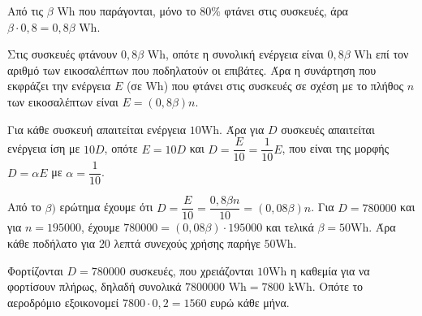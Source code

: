
\begin{alist}
\item Από τις $\beta\text{ Wh}$ που παράγονται, μόνο το $80\%$ φτάνει στις συσκευές, άρα $\beta \cdot 0,8 = 0,8\beta\text{ Wh}$.

\item
\begin{rlist}
\item Στις συσκευές φτάνουν $0,8\beta\text{ Wh}$, οπότε η συνολική ενέργεια είναι $0,8\beta\text{ Wh}$ επί τον αριθμό των εικοσαλέπτων που ποδηλατούν οι επιβάτες. Άρα η συνάρτηση που εκφράζει την ενέργεια $E$ (σε $\text{Wh}$) που φτάνει στις συσκευές σε σχέση με το πλήθος $n$ των εικοσαλέπτων είναι $E = (0,8\beta)n$.
\item Για κάθε συσκευή απαιτείται ενέργεια $10\text{Wh}$. Άρα για $D$ συσκευές απαιτείται ενέργεια ίση με $10D$, οπότε $E = 10D$ και $D = \dfrac{E}{10} = \dfrac{1}{10}E$, που είναι της μορφής $D = \alpha E$ με $\alpha = \dfrac{1}{10}$.
\end{rlist}

\item
\begin{rlist}
\item Από το $\beta)$ ερώτημα έχουμε ότι $D = \dfrac{E}{10} = \dfrac{0,8\beta n}{10} = (0,08\beta)n$.
Για $D = 780000$ και για $n = 195000$, έχουμε $780000 = (0,08\beta) \cdot 195000$ και τελικά $\beta = 50\text{Wh}$. Άρα κάθε ποδήλατο για $20$ λεπτά συνεχούς χρήσης παρήγε $50\text{Wh}$.
\item Φορτίζονται $D = 780000$ συσκευές, που χρειάζονται $10\text{Wh}$ η καθεμία για να φορτίσουν πλήρως, δηλαδή συνολικά $7800000\text{ Wh} = 7800\text{ kWh}$. Οπότε το αεροδρόμιο εξοικονομεί $7800 \cdot 0,2 = 1560$ ευρώ κάθε μήνα.
\end{rlist}
\end{alist}

